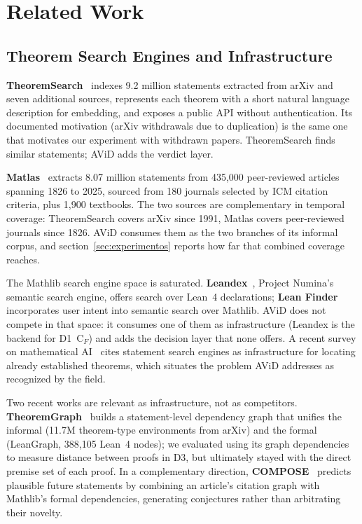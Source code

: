 \documentclass{article}
\theoremstyle{remark}
\begin{document}
\section{Related Work}

\label{sec:related}

\subsection{Theorem Search Engines and Infrastructure}

\textbf{TheoremSearch}~\cite{theoremsearch2026} indexes 9.2 million statements extracted from arXiv and seven additional sources, represents each theorem with a short natural language description for embedding, and exposes a public API without authentication. Its documented motivation (arXiv withdrawals due to duplication) is the same one that motivates our experiment with withdrawn papers. TheoremSearch finds similar statements; AViD adds the verdict layer.

\textbf{Matlas}~\cite{matlas2026} extracts 8.07 million statements from 435,000 peer-reviewed articles spanning 1826 to 2025, sourced from 180 journals selected by ICM citation criteria, plus 1,900 textbooks. The two sources are complementary in temporal coverage: TheoremSearch covers arXiv since 1991, Matlas covers peer-reviewed journals since 1826. AViD consumes them as the two branches of its informal corpus, and section~\ref{sec:experimentos} reports how far that combined coverage reaches.

The Mathlib search engine space is saturated. \textbf{Leandex}~\cite{leandex2026}, Project Numina's semantic search engine, offers search over Lean~4 declarations; \textbf{Lean Finder}~\cite{leanfinder2025} incorporates user intent into semantic search over Mathlib. AViD does not compete in that space: it consumes one of them as infrastructure (Leandex is the backend for D1~C$_F$) and adds the decision layer that none offers. A recent survey on mathematical AI~\cite{survey2026} cites statement search engines as infrastructure for locating already established theorems, which situates the problem AViD addresses as recognized by the field.

Two recent works are relevant as infrastructure, not as competitors. \textbf{TheoremGraph}~\cite{theoremgraph2026} builds a statement-level dependency graph that unifies the informal (11.7M theorem-type environments from arXiv) and the formal (LeanGraph, 388,105 Lean~4 nodes); we evaluated using its graph dependencies to measure distance between proofs in D3, but ultimately stayed with the direct premise set of each proof. In a complementary direction, \textbf{COMPOSE}~\cite{compose2026} predicts plausible future statements by combining an article's citation graph with Mathlib's formal dependencies, generating conjectures rather than arbitrating their novelty.
\end{document}
